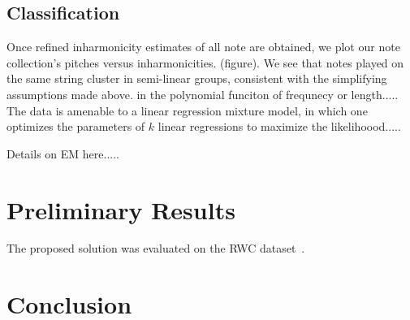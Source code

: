 \documentclass[12pt]{cmuthesis}
\begin{document}
\section{Classification}

Once refined inharmonicity estimates of all note are obtained, we plot our note collection's pitches versus inharmonicities. (figure). We see that notes played on the same string cluster in semi-linear groups, consistent with the simplifying assumptions made above. in the polynomial funciton of frequnecy or length..... The data is amenable to a linear regression mixture model, in which one optimizes the parameters of ${k}$ linear regressions to maximize the likelihoood..... ~\cite{faria2010}

Details on EM here.....

\chapter{Preliminary Results}
The proposed solution was evaluated on the RWC dataset~\cite{goto2003}. 

\chapter{Conclusion}

%

\backmatter


\renewcommand{\bibsection}{\chapter{\bibname}}

\end{document}
